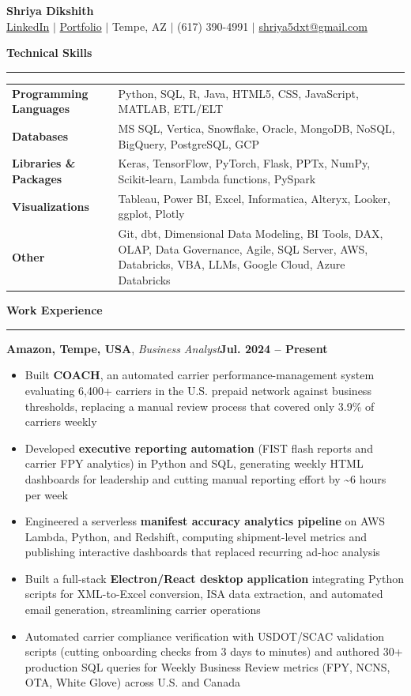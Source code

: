 \documentclass[letterpaper,10pt]{article}
\newcommand{\resumesection}[1]{%
  \vspace{2pt}%
  {\large\bfseries\color{headblue}#1}\par%
  \vspace{1pt}%
  \noindent\rule{\textwidth}{0.6pt}\par%
  \vspace{1pt}%
}
\newcommand{\jobheading}[3]{%
  \textbf{#1}, \textit{#2}\hfill\textbf{#3}\par\vspace{1pt}%
}
\newenvironment{bullets}{%
  \begin{itemize}[leftmargin=0.2in,label=$\bullet$,topsep=1pt,itemsep=1pt,parsep=0pt]%
}{%
  \end{itemize}\vspace{1pt}%
}
\begin{document}
\begin{center}
    {\LARGE\bfseries\color{headblue} Shriya Dikshith}\\[2pt]
    \href{https://www.linkedin.com/in/shriya-dikshith/}{LinkedIn} $|$
    \href{https://shriyadxt.github.io/}{Portfolio} $|$
    Tempe, AZ $|$
    (617) 390-4991 $|$
    \href{mailto:shriya5dxt@gmail.com}{shriya5dxt@gmail.com}
\end{center}

\resumesection{Technical Skills}
\begin{tabularx}{\textwidth}{@{}>{\bfseries}l @{\hspace{6pt}} X@{}}
Programming Languages & Python, SQL, R, Java, HTML5, CSS, JavaScript, MATLAB, ETL/ELT \\
Databases             & MS SQL, Vertica, Snowflake, Oracle, MongoDB, NoSQL, BigQuery, PostgreSQL, GCP \\
Libraries \& Packages & Keras, TensorFlow, PyTorch, Flask, PPTx, NumPy, Scikit-learn, Lambda functions, PySpark \\
Visualizations        & Tableau, Power BI, Excel, Informatica, Alteryx, Looker, ggplot, Plotly \\
Other                 & Git, dbt, Dimensional Data Modeling, BI Tools, DAX, OLAP, Data Governance, Agile, SQL Server, AWS, Databricks, VBA, LLMs, Google Cloud, Azure Databricks \\
\end{tabularx}

\resumesection{Work Experience}

\jobheading{Amazon, Tempe, USA}{Business Analyst}{Jul. 2024 -- Present}
\begin{bullets}
\item Built \textbf{COACH}, an automated carrier performance-management system evaluating 6,400+ carriers in the U.S. prepaid network against business thresholds, replacing a manual review process that covered only 3.9\% of carriers weekly
\item Developed \textbf{executive reporting automation} (FIST flash reports and carrier FPY analytics) in Python and SQL, generating weekly HTML dashboards for leadership and cutting manual reporting effort by \textasciitilde6 hours per week
\item Engineered a serverless \textbf{manifest accuracy analytics pipeline} on AWS Lambda, Python, and Redshift, computing shipment-level metrics and publishing interactive dashboards that replaced recurring ad-hoc analysis
\item Built a full-stack \textbf{Electron/React desktop application} integrating Python scripts for XML-to-Excel conversion, ISA data extraction, and automated email generation, streamlining carrier operations
\item Automated carrier compliance verification with USDOT/SCAC validation scripts (cutting onboarding checks from 3 days to minutes) and authored 30+ production SQL queries for Weekly Business Review metrics (FPY, NCNS, OTA, White Glove) across U.S. and Canada
\end{bullets}
\end{document}
